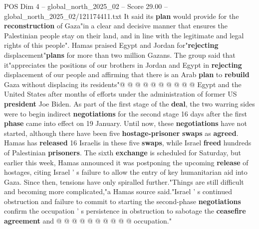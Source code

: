 \begin{textsample}{POS Dim 4 – global\_north\_2025\_02 – Score 29.00 – global\_north\_2025\_02/121174411.txt}
It said its \textbf{plan} would provide for the \textbf{reconstruction} of Gaza"in a clear and decisive manner that ensures the Palestinian people stay on their land, and in line with the legitimate and legal rights of this people".
Hamas praised Egypt and Jordan for"\textbf{rejecting} displacement"\textbf{plans} for more than two million Gazans.
The group said that it"appreciates the positions of our brothers in Jordan and Egypt in \textbf{rejecting} displacement of our people and affirming that there is an Arab \textbf{plan} to \textbf{rebuild} Gaza without displacing its residents"@ @ @ @ @ @ @ @ @ @ Egypt and the United States after months of efforts under the administration of former US \textbf{president} Joe Biden.
As part of the first stage of the \textbf{deal}, the two warring sides were to begin indirect \textbf{negotiations} for the second stage 16 days after the first \textbf{phase} came into effect on 19 January.
Until now, these \textbf{negotiations} have not started, although there have been five \textbf{hostage-prisoner} \textbf{swaps} as \textbf{agreed}.
Hamas has \textbf{released} 16 Israelis in these five \textbf{swaps}, while Israel \textbf{freed} hundreds of Palestinian \textbf{prisoners}.
The sixth \textbf{exchange} is scheduled for Saturday, but earlier this week, Hamas announced it was postponing the upcoming \textbf{release} of hostages, citing Israel ' s failure to allow the entry of key humanitarian aid into Gaza.
Since then, tensions have only spiralled further."Things are still difficult and becoming more complicated,"a Hamas source said."Israel ' s continued obstruction and failure to commit to starting the second-phase \textbf{negotiations} confirm the occupation ' s persistence in obstruction to sabotage the \textbf{ceasefire} \textbf{agreement} and @ @ @ @ @ @ @ @ @ @ occupation."

\end{textsample}
